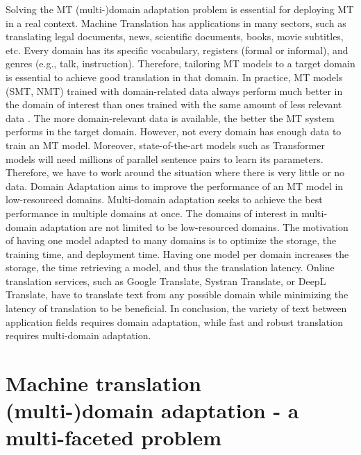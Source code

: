 Solving the MT (multi-)domain adaptation problem is essential for deploying MT in a real context. Machine Translation has applications in many sectors, such as translating legal documents, news, scientific documents, books, movie subtitles, etc. Every domain has its specific vocabulary, registers (formal or informal), and genres (e.g., talk, instruction). Therefore, tailoring MT models to a target domain is essential to achieve good translation in that domain. In practice, MT models (SMT, NMT) trained with domain-related data always perform much better in the domain of interest than ones trained with the same amount of less relevant data \citep{Rico13domain, Saunders21Domain}. The more domain-relevant data is available, the better the MT system performs in the target domain. However, not every domain has enough data to train an MT model. Moreover, state-of-the-art models such as Transformer models will need millions of parallel sentence pairs to learn its parameters. Therefore, we have to work around the situation where there is very little or no data. Domain Adaptation aims to improve the performance of an MT model in low-resourced domains. Multi-domain adaptation seeks to achieve the best performance in multiple domains at once. The domains of interest in multi-domain adaptation are not limited to be low-resourced domains. The motivation of having one model adapted to many domains is to optimize the storage, the training time, and deployment time. Having one model per domain increases the storage, the time retrieving a model, and thus the translation latency. Online translation services, such as Google Translate, Systran Translate, or DeepL Translate, have to translate text from any possible domain while minimizing the latency of translation to be beneficial. In conclusion, the variety of text between application fields requires domain adaptation, while fast and robust translation requires multi-domain adaptation.

\section{Machine translation (multi-)domain adaptation - a multi-faceted problem}
\label{sec:multi-facet}
